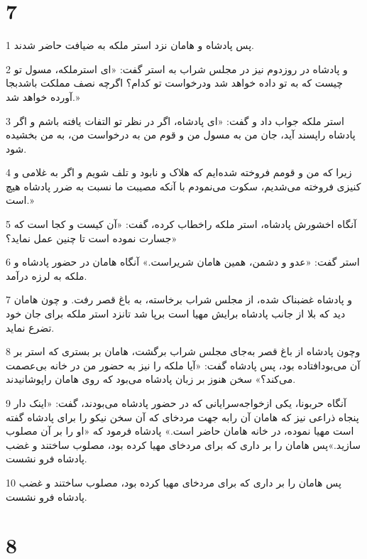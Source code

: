 \chapter{7}

\par 1 پس پادشاه و هامان نزد استر ملکه به ضیافت حاضر شدند.
\par 2 و پادشاه در روزدوم نیز در مجلس شراب به استر گفت: «ای استرملکه، مسول تو چیست که به تو داده خواهد شد ودرخواست تو کدام؟ اگر‌چه نصف مملکت باشدبجا آورده خواهد شد.»
\par 3 استر ملکه جواب داد و گفت: «ای پادشاه، اگر در نظر تو التفات یافته باشم و اگر پادشاه راپسند آید، جان من به مسول من و قوم من به درخواست من، به من بخشیده شود.
\par 4 زیرا که من و قومم فروخته شده‌ایم که هلاک و نابود و تلف شویم و اگر به غلامی و کنیزی فروخته می‌شدیم، سکوت می‌نمودم با آنکه مصیبت ما نسبت به ضرر پادشاه هیچ است.»
\par 5 آنگاه اخشورش پادشاه، استر ملکه راخطاب کرده، گفت: «آن کیست و کجا است که جسارت نموده است تا چنین عمل نماید؟»
\par 6 استر گفت: «عدو و دشمن، همین هامان شریراست.» آنگاه هامان در حضور پادشاه و ملکه به لرزه درآمد.
\par 7 و پادشاه غضبناک شده، از مجلس شراب برخاسته، به باغ قصر رفت. و چون هامان دید که بلا از جانب پادشاه برایش مهیا است برپا شد تانزد استر ملکه برای جان خود تضرع نماید.
\par 8 وچون پادشاه از باغ قصر به‌جای مجلس شراب برگشت، هامان بر بستری که استر بر آن می‌بودافتاده بود، پس پادشاه گفت: «آیا ملکه را نیز به حضور من در خانه بی‌عصمت می‌کند؟» سخن هنوز بر زبان پادشاه می‌بود که روی هامان راپوشانیدند.
\par 9 آنگاه حربونا، یکی ازخواجه‌سرایانی که در حضور پادشاه می‌بودند، گفت: «اینک دار پنجاه ذراعی نیز که هامان آن رابه جهت مردخای که آن سخن نیکو را برای پادشاه گفته است مهیا نموده، در خانه هامان حاضر است.» پادشاه فرمود که «او را بر آن مصلوب سازید.»پس هامان را بر داری که برای مردخای مهیا کرده بود، مصلوب ساختند و غضب پادشاه فرو نشست.
\par 10 پس هامان را بر داری که برای مردخای مهیا کرده بود، مصلوب ساختند و غضب پادشاه فرو نشست.
 
\chapter{8}

